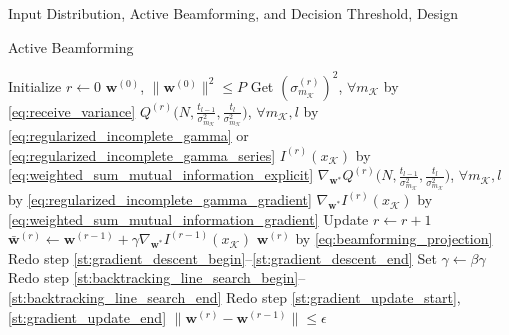 \documentclass[journal]{IEEEtran}
\begin{document}
\begin{section}{Input Distribution, Active Beamforming, and Decision Threshold, Design}
\begin{subsection}{Active Beamforming}
\begin{algorithm}[!t]
\begin{algorithmic}[1]
				\State Initialize $r \gets 0$
				\State \phantom{Initialize} $\boldsymbol{w}^{(0)}$, $\lVert\boldsymbol{w}^{(0)}\rVert^2 \le P$
				\State Get $(\sigma_{m_{\mathcal{K}}}^{(r)})^2$, $\forall m_{\mathcal{K}}$ by \eqref{eq:receive_variance} \label{st:gradient_descent_begin}
				\State \phantom{Get} $Q^{(r)}\bigl(N,\frac{t_{l-1}}{\sigma_{m_{\mathcal{K}}}^2},\frac{t_l}{\sigma_{m_{\mathcal{K}}}^2}\bigr)$, $\forall m_{\mathcal{K}},l$ by \eqref{eq:regularized_incomplete_gamma} or \eqref{eq:regularized_incomplete_gamma_series}
				\State \phantom{Get} $I^{(r)}(x_{\mathcal{K}})$ by \eqref{eq:weighted_sum_mutual_information_explicit} \label{st:gradient_descent_end}
				\State \phantom{Get} $\nabla_{\boldsymbol{w}^*} Q^{(r)}\bigl(N,\frac{t_{l-1}}{\sigma_{m_{\mathcal{K}}}^2},\frac{t_l}{\sigma_{m_{\mathcal{K}}}^2}\bigr)$, $\forall m_{\mathcal{K}},l$ by \eqref{eq:regularized_incomplete_gamma_gradient} \label{st:gradient_update_start}
				\State \phantom{Get} $\nabla_{\boldsymbol{w}^*} I^{(r)}(x_{\mathcal{K}})$ by \eqref{eq:weighted_sum_mutual_information_gradient} \label{st:gradient_update_end}
				\Repeat
					\State Update $r \gets r+1$
					\State \phantom{Update} $\bar{\boldsymbol{w}}^{(r)} \gets \boldsymbol{w}^{(r-1)}+\gamma\nabla_{\boldsymbol{w}^*} I^{(r-1)}(x_{\mathcal{K}})$ \label{st:backtracking_line_search_begin}
					\State \phantom{Update} $\boldsymbol{w}^{(r)}$ by \eqref{eq:beamforming_projection}
					\State Redo step \ref{st:gradient_descent_begin}--\ref{st:gradient_descent_end} \label{st:backtracking_line_search_end}
						\State Set $\gamma\gets\beta\gamma$
						\State Redo step \ref{st:backtracking_line_search_begin}--\ref{st:backtracking_line_search_end}
					\EndWhile
					\State Redo step \ref{st:gradient_update_start}, \ref{st:gradient_update_end}
				\Until $\lVert\boldsymbol{w}^{(r)}-\boldsymbol{w}^{(r-1)}\rVert \le \epsilon$
			\end{algorithmic}
		\end{algorithm}
	\end{subsection}


\end{section}
\end{document}
